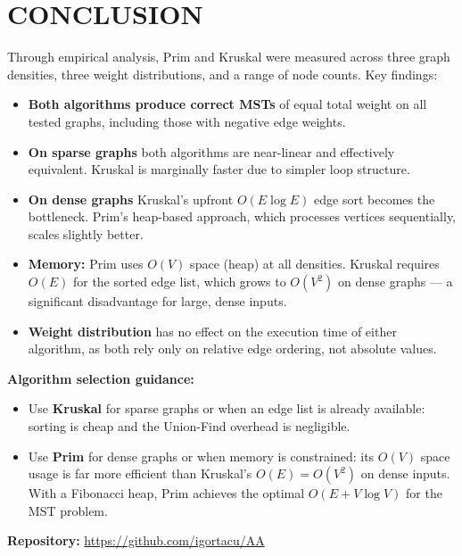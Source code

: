 \documentclass[12pt]{article}
\begin{document}
\section*{CONCLUSION}

\hspace{0.8cm} Through empirical analysis, Prim and Kruskal were measured across
three graph densities, three weight distributions, and a range of node counts.
Key findings:

\begin{itemize}
  \item \textbf{Both algorithms produce correct MSTs} of equal total weight on all
        tested graphs, including those with negative edge weights.

  \item \textbf{On sparse graphs} both algorithms are near-linear and effectively
        equivalent. Kruskal is marginally faster due to simpler loop structure.

  \item \textbf{On dense graphs} Kruskal's upfront $O(E \log E)$ edge sort becomes
        the bottleneck. Prim's heap-based approach, which processes vertices
        sequentially, scales slightly better.

  \item \textbf{Memory:} Prim uses $O(V)$ space (heap) at all densities. Kruskal
        requires $O(E)$ for the sorted edge list, which grows to $O(V^2)$ on dense
        graphs — a significant disadvantage for large, dense inputs.

  \item \textbf{Weight distribution} has no effect on the execution time of either
        algorithm, as both rely only on relative edge ordering, not absolute values.
\end{itemize}

\textbf{Algorithm selection guidance:}
\begin{itemize}
  \item Use \textbf{Kruskal} for sparse graphs or when an edge list is already
        available: sorting is cheap and the Union-Find overhead is negligible.
  \item Use \textbf{Prim} for dense graphs or when memory is constrained:
        its $O(V)$ space usage is far more efficient than Kruskal's $O(E) = O(V^2)$
        on dense inputs. With a Fibonacci heap, Prim achieves the optimal
        $O(E + V \log V)$ for the MST problem.
\end{itemize}

\vspace{0.5cm}
\noindent\textbf{Repository:} \url{https://github.com/igortacu/AA}

\pagebreak
\end{document}
